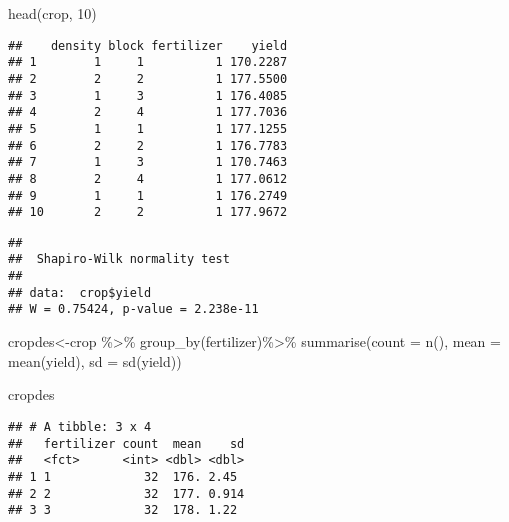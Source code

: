 \documentclass[
]{article}
\newenvironment{Shaded}{\begin{snugshade}}{\end{snugshade}}
\newcommand{\AttributeTok}[1]{\textcolor[rgb]{0.77,0.63,0.00}{#1}}
\newcommand{\DecValTok}[1]{\textcolor[rgb]{0.00,0.00,0.81}{#1}}
\newcommand{\FunctionTok}[1]{\textcolor[rgb]{0.00,0.00,0.00}{#1}}
\newcommand{\NormalTok}[1]{#1}
\newcommand{\OtherTok}[1]{\textcolor[rgb]{0.56,0.35,0.01}{#1}}
\newcommand{\SpecialCharTok}[1]{\textcolor[rgb]{0.00,0.00,0.00}{#1}}
\begin{document}
\begin{Shaded}
\begin{Highlighting}[]
\FunctionTok{head}\NormalTok{(crop, }\DecValTok{10}\NormalTok{)}
\end{Highlighting}
\end{Shaded}

\begin{verbatim}
##    density block fertilizer    yield
## 1        1     1          1 170.2287
## 2        2     2          1 177.5500
## 3        1     3          1 176.4085
## 4        2     4          1 177.7036
## 5        1     1          1 177.1255
## 6        2     2          1 176.7783
## 7        1     3          1 170.7463
## 8        2     4          1 177.0612
## 9        1     1          1 176.2749
## 10       2     2          1 177.9672
\end{verbatim}

\begin{Shaded}
\end{Shaded}

\begin{verbatim}
## 
##  Shapiro-Wilk normality test
## 
## data:  crop$yield
## W = 0.75424, p-value = 2.238e-11
\end{verbatim}

\begin{Shaded}
\begin{Highlighting}[]
\NormalTok{cropdes}\OtherTok{\textless{}{-}}\NormalTok{crop }\SpecialCharTok{\%\textgreater{}\%} \FunctionTok{group\_by}\NormalTok{(fertilizer)}\SpecialCharTok{\%\textgreater{}\%}
  \FunctionTok{summarise}\NormalTok{(}\AttributeTok{count =} \FunctionTok{n}\NormalTok{(),}
            \AttributeTok{mean =} \FunctionTok{mean}\NormalTok{(yield),}
            \AttributeTok{sd =} \FunctionTok{sd}\NormalTok{(yield))}

\NormalTok{cropdes }
\end{Highlighting}
\end{Shaded}

\begin{verbatim}
## # A tibble: 3 x 4
##   fertilizer count  mean    sd
##   <fct>      <int> <dbl> <dbl>
## 1 1             32  176. 2.45 
## 2 2             32  177. 0.914
## 3 3             32  178. 1.22
\end{verbatim}
\end{document}
